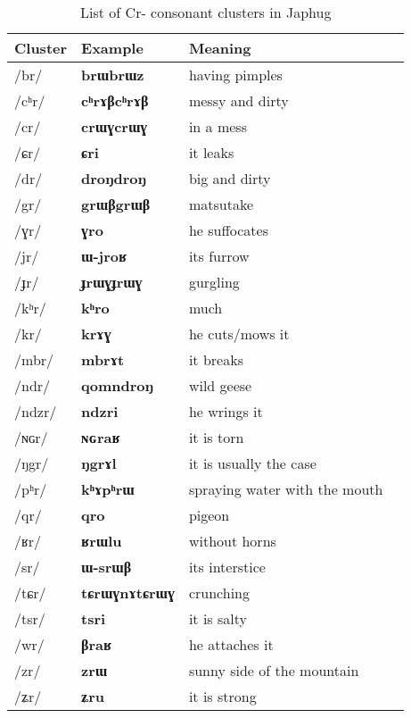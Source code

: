 \documentclass[oneside,a4paper,11pt]{article}
\newcommand{\ipa}[1]{{\phon\mbox{\textbf{#1}}}}
\newcommand{\deux}[1]{/#1/}
\newcommand{\idph}[1]{\cellcolor{gray}\textbf{#1}}
\begin{document}
\begin{table}[H]
\caption{List of Cr- consonant clusters in Japhug} \label{tab:Cr} \centering
\begin{tabular}{llll}
\toprule
Cluster &Example &Meaning \\
\midrule
   \deux{br} \idph{}  	&   \ipa{brɯbrɯz}   	&   having pimples \\
  \deux{cʰr}\idph{}   	&   \ipa{cʰrɤβcʰrɤβ}   	&   messy and dirty \\
  \deux{cr} \idph{}  	&   \ipa{crɯɣcrɯɣ}   	&   in a mess  \\
  \deux{ɕr}   	&   \ipa{ɕri}   	&   it leaks \\
  \deux{dr} \idph{}  	&   \ipa{droŋdroŋ}   	&   big and dirty \\
  \deux{gr}   	&   \ipa{grɯβgrɯβ}   	&  matsutake  \\
  \deux{ɣr}   	&   \ipa{ɣro}   	&   he suffocates \\
  \deux{jr}   	&   \ipa{ɯ-jroʁ}   	&  its furrow  \\
  \deux{ɟr} \idph{}  	&   \ipa{ɟrɯɣɟrɯɣ}   	&   gurgling \\
  \deux{kʰr}   	&   \ipa{kʰro}   	&  much  \\
  \deux{kr}   	&   \ipa{krɤɣ}   	&   he cuts/mows it \\
  \deux{mbr}   	&   \ipa{mbrɤt}   	&  it breaks  \\
  \deux{ndr}   	&   \ipa{qomndroŋ}   	&   wild geese \\
  \deux{ndzr}   	&   \ipa{ndzri}   	&   he wrings it \\
  \deux{ɴɢr}   	&   \ipa{ɴɢraʁ}   	&  it is torn  \\
  \deux{ŋgr}   	&   \ipa{ŋgrɤl}   	&  it is usually the case  \\
  \deux{pʰr}   	&   \ipa{kʰɤpʰrɯ}   	&   spraying water with the mouth \\
  \deux{qr}   	&   \ipa{qro}   	&   pigeon \\
  \deux{ʁr}   	&   \ipa{ʁrɯlu}   	&   without horns \\
  \deux{sr}   	&   \ipa{ɯ-srɯβ}   	&  its interstice  \\
  \deux{tɕr} \idph{}  	&   \ipa{tɕrɯɣnɤtɕrɯɣ}   	&   crunching \\
  \deux{tsr}   	&   \ipa{tsri}   	&   it is salty \\
  \deux{wr}   	&   \ipa{βraʁ}   	&  he attaches it  \\
  \deux{zr}   	&   \ipa{zrɯ}   	&  sunny side of the mountain  \\
  \deux{ʑr}   	&   \ipa{ʑru}   	&  it is strong  \\
  \bottomrule
  \end{tabular}  
\end{table}  
  
\end{document}
